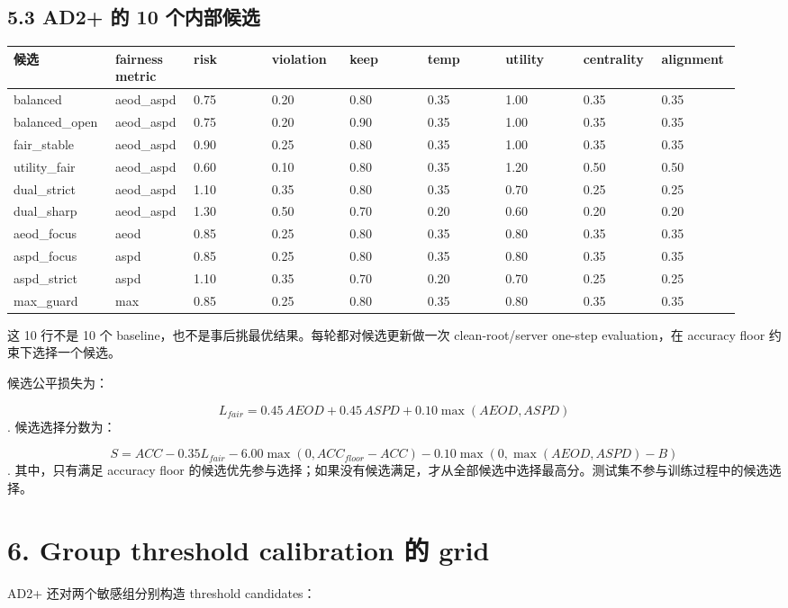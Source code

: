 \documentclass[UTF8,a4paper,10pt]{ctexart}
\begin{document}
\subsection{5.3 AD2+ 的 10 个内部候选}
{\tiny
\renewcommand{\arraystretch}{1.18}
\begin{longtable}{|p{0.105\linewidth}|p{0.105\linewidth}|p{0.105\linewidth}|p{0.105\linewidth}|p{0.105\linewidth}|p{0.105\linewidth}|p{0.105\linewidth}|p{0.105\linewidth}|p{0.105\linewidth}|}
\hline
候选 & fairness metric & risk & violation & keep & temp & utility & centrality & alignment \\\hline
\endhead
balanced & aeod\_aspd & 0.75 & 0.20 & 0.80 & 0.35 & 1.00 & 0.35 & 0.35 \\\hline
balanced\_open & aeod\_aspd & 0.75 & 0.20 & 0.90 & 0.35 & 1.00 & 0.35 & 0.35 \\\hline
fair\_stable & aeod\_aspd & 0.90 & 0.25 & 0.80 & 0.35 & 1.00 & 0.35 & 0.35 \\\hline
utility\_fair & aeod\_aspd & 0.60 & 0.10 & 0.80 & 0.35 & 1.20 & 0.50 & 0.50 \\\hline
dual\_strict & aeod\_aspd & 1.10 & 0.35 & 0.80 & 0.35 & 0.70 & 0.25 & 0.25 \\\hline
dual\_sharp & aeod\_aspd & 1.30 & 0.50 & 0.70 & 0.20 & 0.60 & 0.20 & 0.20 \\\hline
aeod\_focus & aeod & 0.85 & 0.25 & 0.80 & 0.35 & 0.80 & 0.35 & 0.35 \\\hline
aspd\_focus & aspd & 0.85 & 0.25 & 0.80 & 0.35 & 0.80 & 0.35 & 0.35 \\\hline
aspd\_strict & aspd & 1.10 & 0.35 & 0.70 & 0.20 & 0.70 & 0.25 & 0.25 \\\hline
max\_guard & max & 0.85 & 0.25 & 0.80 & 0.35 & 0.80 & 0.35 & 0.35 \\\hline
\end{longtable}
}
这 10 行不是 10 个 baseline，也不是事后挑最优结果。每轮都对候选更新做一次 clean-root/server one-step evaluation，在 accuracy floor 约束下选择一个候选。

候选公平损失为：

\[L_{fair}=0.45\,AEOD+0.45\,ASPD+0.10\max(AEOD,ASPD)\].
候选选择分数为：

\[S=ACC-0.35L_{fair}-6.00\max(0,ACC_{floor}-ACC)-0.10\max(0,\max(AEOD,ASPD)-B)\].
其中，只有满足 accuracy floor 的候选优先参与选择；如果没有候选满足，才从全部候选中选择最高分。测试集不参与训练过程中的候选选择。

\section{6. Group threshold calibration 的 grid}
AD2+ 还对两个敏感组分别构造 threshold candidates：
\end{document}
